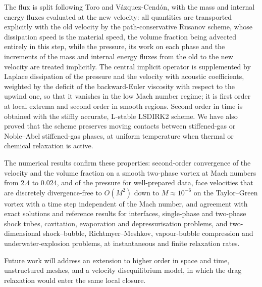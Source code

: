 \documentclass[a4paper,fleqn]{cas-sc}
\begin{document}
The flux is split following Toro and V\'azquez-Cend\'on, with the mass and internal energy fluxes evaluated at the new
velocity: all quantities are transported explicitly with the old velocity by the path-conservative Rusanov scheme, whose
dissipation speed is the material speed, the volume fraction being advected entirely in this step, while the pressure,
its work on each phase and the increments of the mass and internal energy fluxes from the old to the new velocity are
treated implicitly. The central implicit operator is supplemented by Laplace dissipation of the
pressure and the velocity with acoustic coefficients, weighted by the deficit of the backward-Euler viscosity with respect to
the upwind one, so that it vanishes in the low Mach number regime; it is first order at local extrema and second order in
smooth regions. Second
order in time is obtained with the stiffly accurate, L-stable LSDIRK2 scheme. We have also proved that the scheme
preserves moving contacts between stiffened-gas or Noble--Abel stiffened-gas phases, at uniform temperature when thermal or
chemical relaxation is active.

The numerical results confirm these properties: second-order convergence of the velocity and the volume fraction on a
smooth two-phase vortex at Mach numbers from $2.4$ to $0.024$, and of the pressure for well-prepared data, face velocities
that are discretely divergence-free to $O(M^2)$ down to $M\approx10^{-6}$ on the Taylor--Green vortex with a time step
independent of the Mach number, and agreement with exact solutions and reference results
for interfaces, single-phase and two-phase shock tubes, cavitation, evaporation and depressurisation problems, and
two-dimensional shock--bubble, Richtmyer--Meshkov, vapour-bubble compression and underwater-explosion problems, at instantaneous
and finite relaxation rates.

Future work will address an extension to higher order in space and time, unstructured meshes, and a velocity
disequilibrium model, in which the drag relaxation would enter the same local closure.




\end{document}
